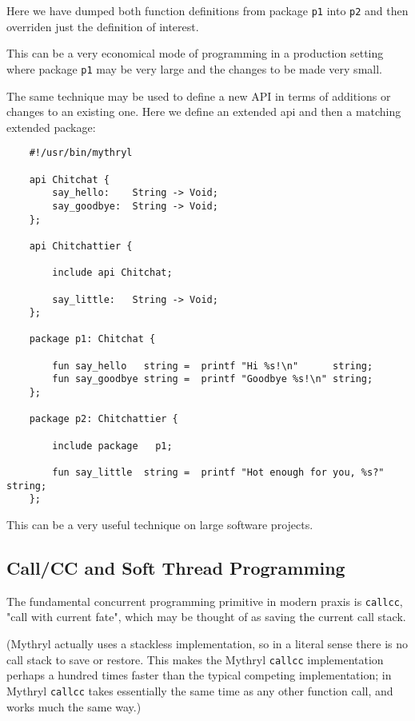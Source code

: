 Here we have dumped both function definitions from package {\tt p1} 
into {\tt p2} and then overriden just the definition of interest.

This can be a very economical mode of programming in a production setting 
where package {\tt p1} may be very large and the changes to be made very 
small.

The same technique may be used to define a new API in terms of additions 
or changes to an existing one.  Here we define an extended api and then 
a matching extended package:

\begin{verbatim}
    #!/usr/bin/mythryl

    api Chitchat {
        say_hello:    String -> Void;
        say_goodbye:  String -> Void;
    };

    api Chitchattier {

        include api Chitchat;

        say_little:   String -> Void;
    };

    package p1: Chitchat {

        fun say_hello   string =  printf "Hi %s!\n"      string;
        fun say_goodbye string =  printf "Goodbye %s!\n" string;
    };

    package p2: Chitchattier {

        include package   p1;

        fun say_little  string =  printf "Hot enough for you, %s?"  string;
    };
\end{verbatim}

This can be a very useful technique on large software projects.

\cutend*

\subsection{Call/CC and Soft Thread Programming}
\label{section:tut:full-monte:callcc}

The fundamental concurrent programming primitive in modern praxis 
is {\tt callcc}, "call with current fate", which may be 
thought of as saving the current call stack.

(Mythryl actually uses a stackless implementation, so in a literal 
sense there is no call stack to save or restore.  This makes the 
Mythryl {\tt callcc} implementation perhaps a hundred times faster 
than the typical competing implementation; in Mythryl {\tt callcc} 
takes essentially the same time as any other function call, and 
works much the same way.)

